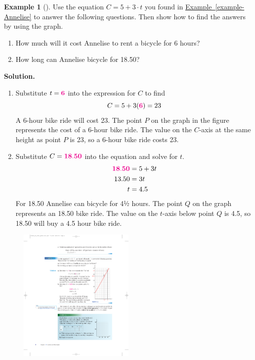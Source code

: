 \documentclass[10pt,]{book}
\theoremstyle{plain}
\theoremstyle{definition}
\theoremstyle{definition}
\theoremstyle{definition}
\newtheorem{example}[theorem]{Example}
\theoremstyle{definition}
\theoremstyle{definition}
\numberwithin{equation}{section}
\newcommand{\alert}[1]{\mathbf{\color{magenta}{#1}}}
\newcommand{\amp}{ & }
\begin{document}
\begin{example}[]\label{example-6hrbike}
Use the equation \(C=5+3\cdot t\) you found in \hyperref[example-Annelise]{Example~\ref{example-Annelise}} to answer the following questions.  Then show how to find the answers by using the graph.%
\leavevmode%
\begin{enumerate}[label=*\alph**]
\item\hypertarget{li-19}{}How much will it cost Annelise to rent a bicycle for 6 hours?%
\item\hypertarget{li-20}{}How long can Annelise bicycle for \textdollar{}18.50?%
\end{enumerate}
\par\medskip\noindent%
\textbf{Solution.}\quad \leavevmode%
\begin{enumerate}[label=*\alph**]
\item\hypertarget{li-21}{}Substitute \(t=\alert{6}\) into the expression for \(C\) to find \begin{equation*}C=5+3(\alert{6})=23\end{equation*}A 6-hour bike ride will cost \textdollar{}23.  The point \(P\) on the graph in the figure represents the cost of a 6-hour bike ride.  The value on the \(C\)-axis at the same height as point \(P\) is 23, so a 6-hour bike ride costs \textdollar{}23.%
\item\hypertarget{li-22}{}Substitute \(C=\alert{18.50}\) into the equation and solve for \(t\).
        \begin{align*}
\alert{18.50}\amp=5+3t\\
13.50\amp=3t\\
t\amp=4.5
\end{align*}
        For \textdollar{}18.50 Annelise can bicycle for 4½ hours. The point \(Q\)  on the graph represents an \textdollar{}18.50 bike ride.  The value on the \(t\)-axis below point \(Q\) is 4.5, so \textdollar{}18.50 will buy a 4.5 hour bike ride.%
\end{enumerate}
\leavevmode%
\begin{figure}
\centering
\includegraphics[width=0.50\textwidth,]{images/fig1-2.pdf}\end{figure}
\end{example}
\end{document}
